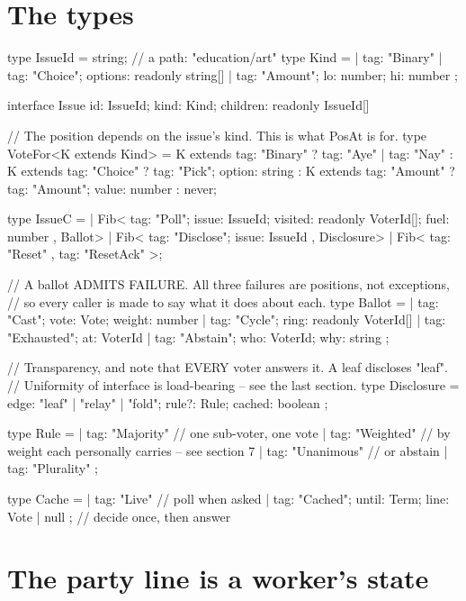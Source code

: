 \documentclass[11pt,a4paper]{article}
\begin{document}
\section{The types}

\begin{term}
type IssueId = string;                       // a path: "education/art"
type Kind =
  | { tag: "Binary" }
  | { tag: "Choice"; options: readonly string[] }
  | { tag: "Amount"; lo: number; hi: number };

interface Issue { id: IssueId; kind: Kind; children: readonly IssueId[] }

// The position depends on the issue's kind. This is what PosAt is for.
type VoteFor<K extends Kind> =
    K extends { tag: "Binary" } ? { tag: "Aye" } | { tag: "Nay" }
  : K extends { tag: "Choice" } ? { tag: "Pick"; option: string }
  : K extends { tag: "Amount" } ? { tag: "Amount"; value: number }
  : never;

type IssueC =
  | Fib<{ tag: "Poll"; issue: IssueId;
          visited: readonly VoterId[]; fuel: number }, Ballot>
  | Fib<{ tag: "Disclose"; issue: IssueId }, Disclosure>
  | Fib<{ tag: "Reset" }, { tag: "ResetAck" }>;

// A ballot ADMITS FAILURE. All three failures are positions, not exceptions,
// so every caller is made to say what it does about each.
type Ballot =
  | { tag: "Cast";      vote: Vote; weight: number }
  | { tag: "Cycle";     ring: readonly VoterId[] }
  | { tag: "Exhausted"; at: VoterId }
  | { tag: "Abstain";   who: VoterId; why: string };

// Transparency, and note that EVERY voter answers it. A leaf discloses "leaf".
// Uniformity of interface is load-bearing -- see the last section.
type Disclosure =
  { edge: "leaf" | "relay" | "fold"; rule?: Rule; cached: boolean };

type Rule =
  | { tag: "Majority" }    // one sub-voter, one vote
  | { tag: "Weighted" }    // by weight each personally carries -- see section 7
  | { tag: "Unanimous" }   // or abstain
  | { tag: "Plurality" };

type Cache =
  | { tag: "Live" }                                  // poll when asked
  | { tag: "Cached"; until: Term; line: Vote | null }; // decide once, then answer
\end{term}

\section{The party line is a worker's state}
\end{document}
